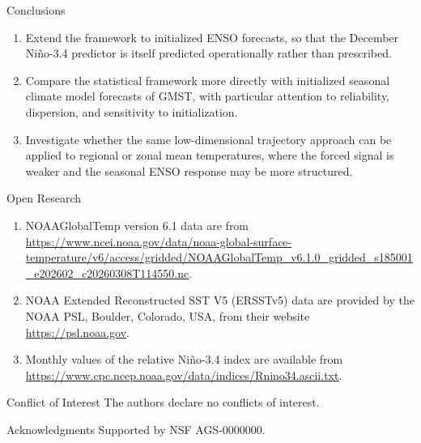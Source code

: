 \documentclass[aspectratio=169,xcolor=dvipsnames]{beamer}
\begin{document}
\begin{frame}[allowframebreaks]{Conclusions}
\begin{enumerate}
\item Extend the framework to initialized ENSO forecasts, so that the
  December Ni\~no-3.4 predictor is itself predicted operationally rather
  than prescribed.

\item Compare the statistical framework more directly with initialized
  seasonal climate model forecasts of GMST, with
  particular attention to reliability, dispersion, and sensitivity to
  initialization.

\item Investigate whether the same low-dimensional trajectory approach
  can be applied to regional or zonal mean temperatures, where the
  forced signal is weaker and the seasonal ENSO response may be more
  structured.

\end{enumerate}
\end{frame}

%
%

\begin{frame}{Open Research}
  \begin{enumerate}
\item NOAAGlobalTemp version 6.1 data are from
  \url{https://www.ncei.noaa.gov/data/noaa-global-surface-temperature/v6/access/gridded/NOAAGlobalTemp_v6.1.0_gridded_s185001_e202602_c20260308T114550.nc}.
\item NOAA Extended Reconstructed SST V5 (ERSSTv5) data are provided
  by the NOAA PSL, Boulder, Colorado, USA, from their website
  \url{https://psl.noaa.gov}.
\item Monthly values of the relative Ni\~no-3.4 index are available
  from
  \url{https://www.cpc.ncep.noaa.gov/data/indices/Rnino34.ascii.txt}.
\end{enumerate}
\end{frame}

\begin{frame}{Conflict of Interest}
  The authors declare no conflicts of interest.
\end{frame}


\begin{frame}{Acknowledgments}
  Supported by NSF AGS-0000000.
\end{frame}
     
\end{document}
